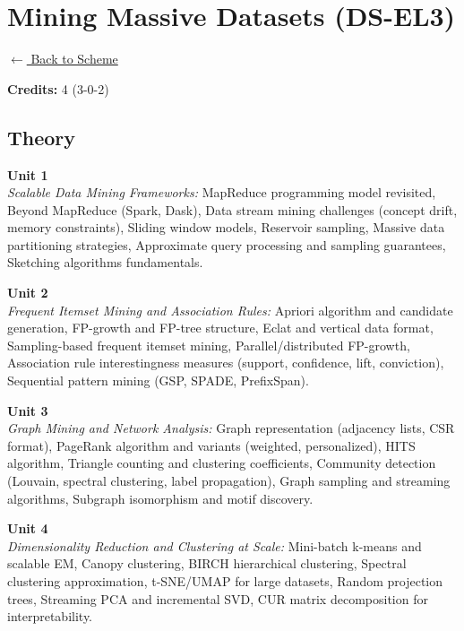 \section*{Mining Massive Datasets (DS-EL3)}
\label{elec:DS_3}

\noindent \small{\hyperref[main:scheme]{$\leftarrow$ Back to Scheme}} \vspace{0.5cm}

\noindent \textbf{Credits:} 4 (3-0-2)

\subsection*{Theory}
\noindent\textbf{Unit 1} \\
\textit{Scalable Data Mining Frameworks:} MapReduce programming model revisited, Beyond MapReduce (Spark, Dask), Data stream mining challenges (concept drift, memory constraints), Sliding window models, Reservoir sampling, Massive data partitioning strategies, Approximate query processing and sampling guarantees, Sketching algorithms fundamentals.

\vspace{0.3cm}

\noindent\textbf{Unit 2} \\
\textit{Frequent Itemset Mining and Association Rules:} Apriori algorithm and candidate generation, FP-growth and FP-tree structure, Eclat and vertical data format, Sampling-based frequent itemset mining, Parallel/distributed FP-growth, Association rule interestingness measures (support, confidence, lift, conviction), Sequential pattern mining (GSP, SPADE, PrefixSpan).

\vspace{0.3cm}

\noindent\textbf{Unit 3} \\
\textit{Graph Mining and Network Analysis:} Graph representation (adjacency lists, CSR format), PageRank algorithm and variants (weighted, personalized), HITS algorithm, Triangle counting and clustering coefficients, Community detection (Louvain, spectral clustering, label propagation), Graph sampling and streaming algorithms, Subgraph isomorphism and motif discovery.

\vspace{0.3cm}

\noindent\textbf{Unit 4} \\
\textit{Dimensionality Reduction and Clustering at Scale:} Mini-batch k-means and scalable EM, Canopy clustering, BIRCH hierarchical clustering, Spectral clustering approximation, t-SNE/UMAP for large datasets, Random projection trees, Streaming PCA and incremental SVD, CUR matrix decomposition for interpretability.

